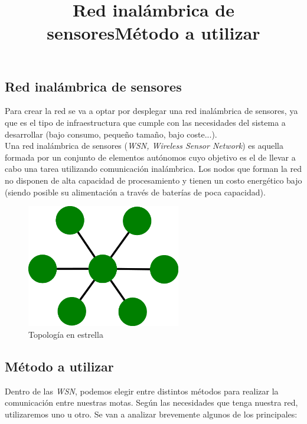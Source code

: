 \subsection{Red inalámbrica de sensores}
\title{Red inalámbrica de sensores}

Para crear la red se va a optar por desplegar una red inalámbrica de sensores, ya que es
el tipo de infraestructura que cumple con las necesidades del sistema a desarrollar
(bajo consumo, pequeño tamaño, bajo coste...).\\

Una red inalámbrica de sensores (\textit{WSN, Wireless Sensor Network}) es aquella formada por un
conjunto de elementos autónomos cuyo objetivo es el de llevar a cabo una tarea utilizando
comunicación inalámbrica. Los nodos que forman la red no disponen de alta capacidad de procesamiento
y tienen un costo energético bajo (siendo posible su alimentación a través de baterías de poca capacidad).\\

\begin{figure}[htb]
\centering
\includegraphics[width=0.6\textwidth]{./imagenes/estrella}
\caption{Topología en estrella} \label{fig:estrella}
\end{figure}

\subsection{Método a utilizar}
\title{Método a utilizar}
Dentro de las \textit{WSN}, podemos elegir entre distintos métodos para realizar la
comunicación entre nuestras motas. Según las necesidades que tenga nuestra red,
utilizaremos uno u otro. Se van a analizar brevemente algunos de los principales:

